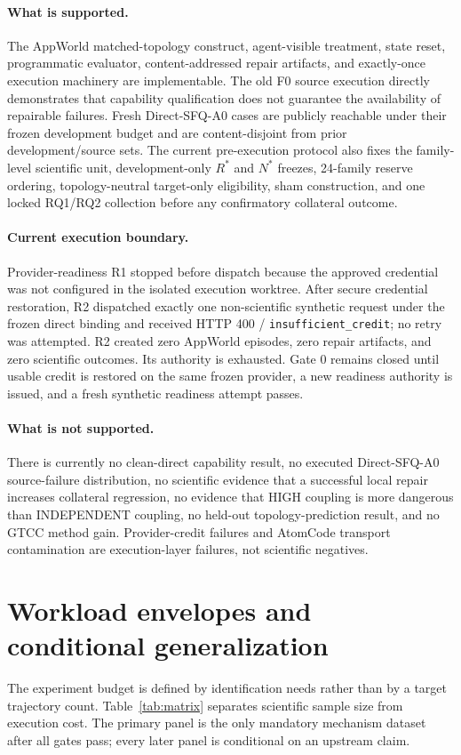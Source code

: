\documentclass{article}
\begin{document}
\paragraph{What is supported.}
The AppWorld matched-topology construct, agent-visible treatment, state reset, programmatic evaluator, content-addressed repair artifacts, and exactly-once execution machinery are implementable. The old F0 source execution directly demonstrates that capability qualification does not guarantee the availability of repairable failures. Fresh Direct-SFQ-A0 cases are publicly reachable under their frozen development budget and are content-disjoint from prior development/source sets. The current pre-execution protocol also fixes the family-level scientific unit, development-only $R^*$ and $N^*$ freezes, 24-family reserve ordering, topology-neutral target-only eligibility, sham construction, and one locked RQ1/RQ2 collection before any confirmatory collateral outcome.

\paragraph{Current execution boundary.}
Provider-readiness R1 stopped before dispatch because the approved credential was not configured in the isolated execution worktree. After secure credential restoration, R2 dispatched exactly one non-scientific synthetic request under the frozen direct binding and received HTTP 400 / \texttt{insufficient\_credit}; no retry was attempted. R2 created zero AppWorld episodes, zero repair artifacts, and zero scientific outcomes. Its authority is exhausted. Gate 0 remains closed until usable credit is restored on the same frozen provider, a new readiness authority is issued, and a fresh synthetic readiness attempt passes.

\paragraph{What is not supported.}
There is currently no clean-direct capability result, no executed Direct-SFQ-A0 source-failure distribution, no scientific evidence that a successful local repair increases collateral regression, no evidence that HIGH coupling is more dangerous than INDEPENDENT coupling, no held-out topology-prediction result, and no GTCC method gain. Provider-credit failures and AtomCode transport contamination are execution-layer failures, not scientific negatives.

\section{Workload envelopes and conditional generalization}
\label{sec:plan}
The experiment budget is defined by identification needs rather than by a target trajectory count. Table~\ref{tab:matrix} separates scientific sample size from execution cost. The primary panel is the only mandatory mechanism dataset after all gates pass; every later panel is conditional on an upstream claim.
\end{document}
